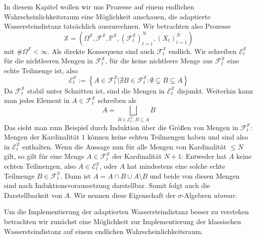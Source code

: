 In diesem Kapitel wollen wir uns Prozesse auf einem endlichen Wahrscheinlichkeitsraum eine Möglichkeit anschauen, die adaptierte Wassersteindistanz tatsächlich auszurechnen. Wir betrachten also Prozesse 
$$\mathbb{X} = \left( \Omega^\mathbb{X}, \mathcal{F}^\mathbb{X}, \mathbb{P}^\mathbb{X}, (\mathcal{F}_t^\mathbb{X})_{t=1}^N, (X_t)_{t=1}^N\right)$$
mit $\#\Omega^\mathbb{X} < \infty$. Als direkte Konsequenz sind auch $\mathcal{F}_t^\mathbb{X}$ endlich. Wir schreiben $\mathcal{E}_t^\mathbb{X}$ für die nichtleeren Mengen in $\mathcal{F}_t^\mathbb{X}$, für die keine nichtleere Menge aus $\mathcal{F}_t^\mathbb{X}$ eine echte Teilmenge ist, also
$$\mathcal{E}_t^\mathbb{X} := \left\{A \in \mathcal{F}_t^\mathbb{X} \vert \nexists B \in \mathcal{F}_t^\mathbb{X}: \emptyset \subsetneq B \subsetneq A \right\}$$
Da $\mathcal{F}_t^\mathbb{X}$ stabil unter Schnitten ist, sind die Mengen in $\mathcal{E}_t^\mathbb{X}$ disjunkt. Weiterhin kann man jedes Element in $A \in \mathcal{F}_t^\mathbb{X}$ schreiben als 
$$A = \bigsqcup_{B \in \mathcal{E}_t^\mathbb{X}, B \subseteq A} B$$
Das sieht man zum Beispiel durch Induktion über die Größen von Mengen in $\mathcal{F}_t^\mathbb{X}$: Mengen der Kardinalität $1$ können keine echten Teilmengen haben und sind also in $\mathcal{E}_t^\mathbb{X}$ enthalten. Wenn die Aussage nun für alle Mengen von Kardinalität $\leq N$ gilt, so gilt für eine Menge $A \in \mathcal{F}_t^\mathbb{X}$ der Kardinalität $N+1$: Entweder hat $A$ keine echten Teilmengen, also $A \in \mathcal{E}_t^\mathbb{X}$, oder $A$ hat mindestens eine solche echte Teilmenge $B \in \mathcal{F}_t^\mathbb{X}$. Dann ist $A=A\cap B \cup A \setminus B$ und beide von diesen Mengen sind nach Induktionsvoraussetzung darstellbar. Somit folgt auch die Darstellbarkeit von $A$. Wir nennen diese Eigenschaft der $\sigma$-Algebren \emph{atomar}.

Um die Implementierung der adaptierten Wassersteindistanz besser zu verstehen betrachten wir zunächst eine Möglichkeit zur Implementierung der klassischen Wassersteindistanz auf einem endlichen Wahrscheinlichkeitsraum. 

